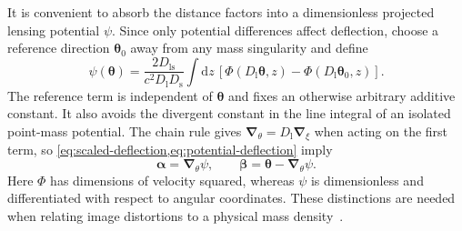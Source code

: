 It is convenient to absorb the distance factors into a dimensionless projected lensing potential $\psi$. Since only potential differences affect deflection, choose a reference direction $\boldsymbol{\theta}_0$ away from any mass singularity and define
\begin{equation}
    \psi(\boldsymbol{\theta})=
    \frac{2D_{\mathrm{ls}}}{c^2D_{\mathrm{l}}D_{\mathrm{s}}}\int \mathrm{d}z\,
    \left[\Phi(D_{\mathrm{l}}\boldsymbol{\theta},z)-\Phi(D_{\mathrm{l}}\boldsymbol{\theta}_0,z)\right].
    \label{eq:projected-potential}
\end{equation}
The reference term is independent of $\boldsymbol{\theta}$ and fixes an otherwise arbitrary additive constant. It also avoids the divergent constant in the line integral of an isolated point-mass potential. The chain rule gives $\boldsymbol{\nabla}_{\theta}=D_{\mathrm{l}}\boldsymbol{\nabla}_{\xi}$ when acting on the first term, so \cref{eq:scaled-deflection,eq:potential-deflection} imply
\begin{equation}
    \boldsymbol{\alpha}=\boldsymbol{\nabla}_{\theta}\psi,
    \qquad
    \boldsymbol{\beta}=\boldsymbol{\theta}-\boldsymbol{\nabla}_{\theta}\psi.
    \label{eq:lens-equation}
\end{equation}
Here $\Phi$ has dimensions of velocity squared, whereas $\psi$ is dimensionless and differentiated with respect to angular coordinates. These distinctions are needed when relating image distortions to a physical mass density~\cite{yoo_weak_2026,schneider_weak_2006}.

